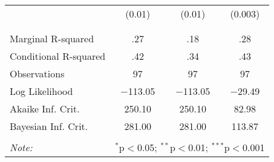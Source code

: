 \begin{table}[!htbp]
\begin{tabular}{@{\extracolsep{5pt}}lccc}
  & (0.01) & (0.01) & (0.003) \\ 
  & & & \\ 
\hline \\[-1.8ex] 
Marginal R-squared & .27 & .18 & .28 \\ 
Conditional R-squared & .42 & .34 & .43 \\ 
Observations & 97 & 97 & 97 \\ 
Log Likelihood & $-$113.05 & $-$113.05 & $-$29.49 \\ 
Akaike Inf. Crit. & 250.10 & 250.10 & 82.98 \\ 
Bayesian Inf. Crit. & 281.00 & 281.00 & 113.87 \\ 
\hline 
\hline \\[-1.8ex] 
\textit{Note:}  & \multicolumn{3}{r}{$^{*}$p$<$0.05; $^{**}$p$<$0.01; $^{***}$p$<$0.001} \\ 
\end{tabular} 
\end{table} 
